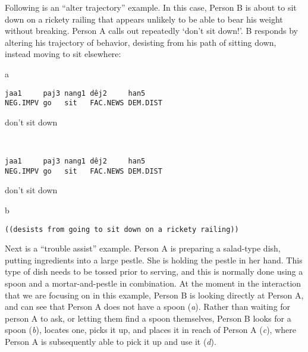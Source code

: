 \documentclass[output=paper]{langsci/langscibook}
\begin{document}
Following is an “alter trajectory” example. In this case, Person B is about to sit down on a rickety railing that appears unlikely to be able to bear his weight without breaking. Person A calls out repeatedly ‘don’t sit down!’. B responds by altering his trajectory of behavior, desisting from his path of sitting down, instead moving to sit elsewhere:

\vspace{2mm}
%
%
\begin{mdframednoverticalspace}[style=firstfoc]
\begin{transbox}{2}{a}
\begin{verbatim}
jaa1     paj3 nang1 dêj2     han5     
NEG.IMPV go   sit   FAC.NEWS DEM.DIST
\end{verbatim}
don't sit down
\end{transbox}
\end{mdframednoverticalspace}
%
\begin{mdframednoverticalspace}[style=firstfoc]
\begin{transbox}{3}{~}
\begin{verbatim}
jaa1     paj3 nang1 dêj2     han5     
NEG.IMPV go   sit   FAC.NEWS DEM.DIST
\end{verbatim}
don't sit down
\end{transbox}
\end{mdframednoverticalspace}
%
\begin{mdframednoverticalspace}[style=secondfoc]
\begin{transbox}{4}{b}
\begin{verbatim}
((desists from going to sit down on a rickety railing))
\end{verbatim}
\end{transbox}
\end{mdframednoverticalspace}

Next is a “trouble assist” example. Person A is preparing a salad-type dish, putting ingredients into a large pestle. She is holding the pestle in her hand. This type of dish needs to be tossed prior to serving, and this is normally done using a spoon and a mortar-and-pestle in combination. At the moment in the interaction that we are focusing on in this example, Person B is looking directly at Person A, and can see that Person A does not have a spoon (\textit{a}). Rather than waiting for person A to ask, or letting them find a spoon themselves, Person B looks for a spoon (\textit{b}), locates one, picks it up, and places it in reach of Person A (\textit{c}), where Person A is subsequently able to pick it up and use it (\textit{d}).
\end{document}

